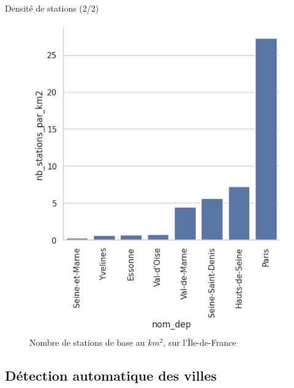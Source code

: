 \begin{frame}{Densité de stations (2/2)}
    \begin{figure}
        \includegraphics[height=0.55\paperheight]{images/barplots/densite_station_par_dep_IDF.png}
        \caption{\label{fig:densite_stat_IDF}Nombre de stations de base au $\unit{km^2}$, sur l'Île-de-France}
    \end{figure}
\end{frame}


\subsection{Détection automatique des villes}
\insertsubsectionframe

